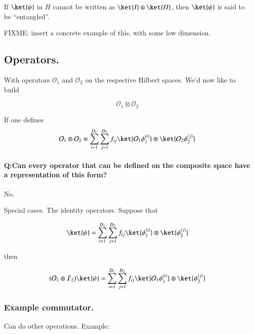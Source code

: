 If $\ket{\psi}$ in $H$ cannot be written as $\ket{I} \otimes \ket{II}$, then $\ket{\psi}$ is said to be ``entangled''.

FIXME: insert a concrete example of this, with some low dimension.

\subsection{Operators.}

With operators $\mathcal{O}_1$ and $\mathcal{O}_2$ on the respective Hilbert spaces.  We'd now like to build 

\begin{equation}\label{eqn:qmTwoL1:230}
\mathcal{O}_1 \otimes \mathcal{O}_2
\end{equation}

If one defines
\begin{equation}\label{eqn:qmTwoL1:250}
\mathcal{O}_1 \otimes \mathcal{O}_2
\equiv
\sum_{i = 1}^{D_1}
\sum_{j = 1}^{D_2}
f_{ij}
\ket{ \mathcal{O}_1 \phi_1^{(i)}} \otimes \ket{ \mathcal{O}_2 \phi_2^{(j)}} 
\end{equation}

\paragraph{Q:Can every operator that can be defined on the composite space have a representation of this form?}

No.

Special cases.  The identity operators.  Suppose that 

\begin{equation}\label{eqn:qmTwoL1:270}
\ket{\psi}
=
\sum_{i = 1}^{D_1}
\sum_{j = 1}^{D_2}
f_{ij}
\ket{ \phi_1^{(i)}} \otimes \ket{ \phi_2^{(j)}} 
\end{equation}

then

\begin{equation}\label{eqn:qmTwoL1:290}
(\mathcal{O}_1 \otimes \mathcal{I}_2) \ket{\psi}
=
\sum_{i = 1}^{D_1}
\sum_{j = 1}^{D_2}
f_{ij}
\ket{ \mathcal{O}_1 \phi_1^{(i)}} \otimes \ket{ \phi_2^{(j)}} 
\end{equation}

\subsubsection{Example commutator.}

Can do other operations.  Example:

